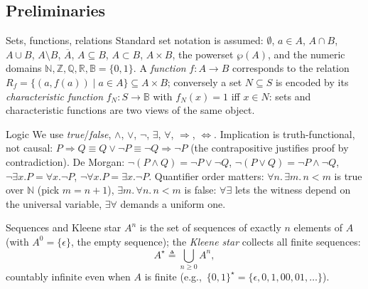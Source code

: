 \subsection{Preliminaries}

\begin{definitionbox}{Sets, functions, relations}
Standard set notation is assumed: $\emptyset$, $a \in A$, $A \cap B$, $A \cup B$, $A \setminus B$, $\overline{A}$, $A \subseteq B$, $A \subset B$, $A \times B$, the powerset $\wp(A)$, and the numeric domains $\mathbb{N}, \mathbb{Z}, \mathbb{Q}, \mathbb{R}, \mathbb{B} = \{0,1\}$. A \emph{function} $f : A \to B$ corresponds to the relation $R_f = \{(a, f(a)) \mid a \in A\} \subseteq A \times B$; conversely a set $N \subseteq S$ is encoded by its \emph{characteristic function} $f_N : S \to \mathbb{B}$ with $f_N(x) = 1$ iff $x \in N$: sets and characteristic functions are two views of the same object.
\end{definitionbox}

\begin{definitionbox}{Logic}
We use \emph{true}/\emph{false}, $\wedge$, $\vee$, $\neg$, $\exists$, $\forall$, $\Rightarrow$, $\Leftrightarrow$. Implication is truth-functional, not causal: $P \Rightarrow Q \equiv Q \vee \neg P \equiv \neg Q \Rightarrow \neg P$ (the contrapositive justifies proof by contradiction). De Morgan: $\neg(P \wedge Q) = \neg P \vee \neg Q$, $\neg(P \vee Q) = \neg P \wedge \neg Q$, $\neg \exists x. P = \forall x. \neg P$, $\neg \forall x. P = \exists x. \neg P$. Quantifier order matters: $\forall n.\, \exists m.\, n < m$ is true over $\mathbb{N}$ (pick $m = n+1$), $\exists m.\, \forall n.\, n < m$ is false: $\forall\exists$ lets the witness depend on the universal variable, $\exists\forall$ demands a uniform one.
\end{definitionbox}

\begin{definitionbox}{Sequences and Kleene star}
$A^n$ is the set of sequences of exactly $n$ elements of $A$ (with $A^0 = \{\epsilon\}$, the empty sequence); the \emph{Kleene star} collects all finite sequences:
\[
  A^\star \triangleq \bigcup_{n \geq 0} A^n,
\]
countably infinite even when $A$ is finite (e.g.,\ $\{0,1\}^\star = \{\epsilon, 0, 1, 00, 01, \ldots\}$).
\end{definitionbox}

